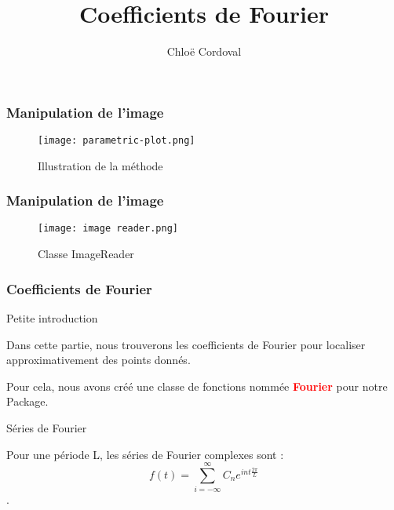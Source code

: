\documentclass[aspectratio=169]{beamer}
\begin{document}
\begin{frame}
\frametitle{Manipulation de l'image }
  \begin{figure}[htpb]
        \begin{center}
            \texttt{[image: parametric-plot.png]}
            \caption{Illustration de la méthode}
        \end{center}
    \end{figure}
\end{frame}
  
 \begin{frame}
  \frametitle{Manipulation de l'image }
  \begin{figure}[htpb]
        \begin{center}
            \texttt{[image: image reader.png]}
            \caption{Classe ImageReader}
        \end{center}
    \end{figure}
  
\end{frame}



\author{Chloë Cordoval}

\title[Présentation du Projet de Développement Logiciel]{Coefficients de Fourier}

\begin{frame}
    \titlepage
    \vspace{-10pt}
\end{frame}


\begin{frame}
\frametitle{Coefficients de Fourier}

\begin{block}{Petite introduction }

Dans cette partie, nous trouverons les coefficients de Fourier pour localiser approximativement des points donnés.

Pour cela, nous avons créé une classe de fonctions nommée \textcolor{red}{\textbf{Fourier}} pour notre Package. 


\end{block}

\begin{block}{Séries de Fourier} 

Pour une période L, les séries de Fourier complexes sont : $$\boxed{f(t) = \sum_{i=-\infty}^{\infty} C_{n} e^{i n t \frac{2\pi}{L}}}$$.

\end{block}
\end{frame}
\end{document}
